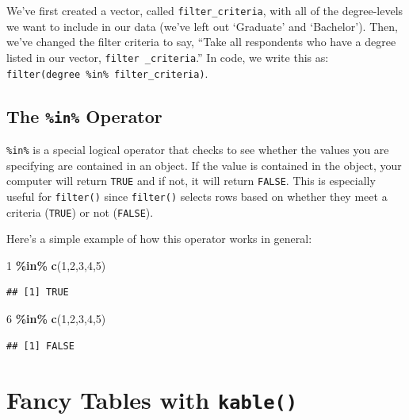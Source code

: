 \documentclass[
]{book}
\newenvironment{Shaded}{\begin{snugshade}}{\end{snugshade}}
\newcommand{\DecValTok}[1]{\textcolor[rgb]{0.00,0.00,0.81}{#1}}
\newcommand{\FunctionTok}[1]{\textcolor[rgb]{0.13,0.29,0.53}{\textbf{#1}}}
\newcommand{\NormalTok}[1]{#1}
\newcommand{\SpecialCharTok}[1]{\textcolor[rgb]{0.81,0.36,0.00}{\textbf{#1}}}
\begin{document}
We've first created a vector, called \texttt{filter\_criteria}, with all of the degree-levels we want to include in our data (we've left out `Graduate' and `Bachelor'). Then, we've changed the filter criteria to say, ``Take all respondents who have a degree listed in our vector, \texttt{filter\ \_criteria}.'' In code, we write this as: \texttt{filter(degree\ \%in\%\ filter\_criteria)}.

\hypertarget{the-in-operator}{%
\subsection{\texorpdfstring{The \texttt{\%in\%} Operator}{The \%in\% Operator}}\label{the-in-operator}}

\texttt{\%in\%} is a special logical operator that checks to see whether the values you are specifying are contained in an object. If the value is contained in the object, your computer will return \texttt{TRUE} and if not, it will return \texttt{FALSE}. This is especially useful for \texttt{filter()} since \texttt{filter()} selects rows based on whether they meet a criteria (\texttt{TRUE}) or not (\texttt{FALSE}).

Here's a simple example of how this operator works in general:

\begin{Shaded}
\begin{Highlighting}[]
\DecValTok{1} \SpecialCharTok{\%in\%} \FunctionTok{c}\NormalTok{(}\DecValTok{1}\NormalTok{,}\DecValTok{2}\NormalTok{,}\DecValTok{3}\NormalTok{,}\DecValTok{4}\NormalTok{,}\DecValTok{5}\NormalTok{)}
\end{Highlighting}
\end{Shaded}

\begin{verbatim}
## [1] TRUE
\end{verbatim}

\begin{Shaded}
\begin{Highlighting}[]
\DecValTok{6} \SpecialCharTok{\%in\%} \FunctionTok{c}\NormalTok{(}\DecValTok{1}\NormalTok{,}\DecValTok{2}\NormalTok{,}\DecValTok{3}\NormalTok{,}\DecValTok{4}\NormalTok{,}\DecValTok{5}\NormalTok{)}
\end{Highlighting}
\end{Shaded}

\begin{verbatim}
## [1] FALSE
\end{verbatim}

\hypertarget{fancy-tables-with-kable}{%
\section{\texorpdfstring{Fancy Tables with \texttt{kable()}}{Fancy Tables with kable()}}\label{fancy-tables-with-kable}}
\end{document}
